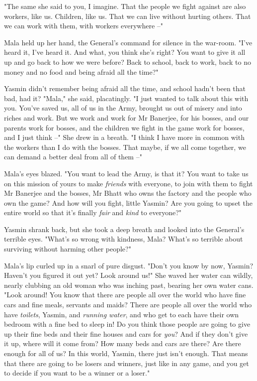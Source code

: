 "The same she said to you, I imagine. That the people we fight
against are also workers, like us. Children, like us. That we can
live without hurting others. That we can work with them, with
workers everywhere --"

Mala held up her hand, the General's command for silence in the
war-room. "I've heard it, I've heard it. And what, you think she's
right? You want to give it all up and go back to how we were
before? Back to school, back to work, back to no money and no food
and being afraid all the time?"

Yasmin didn't remember being afraid all the time, and school hadn't
been that bad, had it? "Mala," she said, placatingly. "I just
wanted to talk about this with you. You've saved us, all of us in
the Army, brought us out of misery and into riches and work. But we
work and work for Mr Banerjee, for his bosses, and our parents work
for bosses, and the children we fight in the game work for bosses,
and I just think --" She drew in a breath. "I think I have more in
common with the workers than I do with the bosses. That maybe, if
we all come together, we can demand a better deal from all of them
--"

Mala's eyes blazed. "You want to lead the Army, is that it? You
want to take us on this mission of yours to make \emph{friends}
with everyone, to join with them to fight Mr Banerjee and the
bosses, Mr Bhatt who owns the factory and the people who own the
game? And how will you fight, little Yasmin? Are you going to upset
the entire world so that it's finally \emph{fair} and \emph{kind}
to everyone?"

Yasmin shrank back, but she took a deep breath and looked into the
General's terrible eyes. "What's so wrong with kindness, Mala?
What's so terrible about surviving without harming other people?"

Mala's lip curled up in a snarl of pure disgust. "Don't you know by
now, Yasmin? Haven't you figured it out yet? Look around us!" She
waved her water can wildly, nearly clubbing an old woman who was
inching past, bearing her own water cans. "Look around! You know
that there are people all over the world who have fine cars and
fine meals, servants and maids? There are people all over the world
who have \emph{toilets}, Yasmin, and \emph{running water}, and who
get to each have their own bedroom with a fine bed to sleep in! Do
you think those people are going to give up their fine beds and
their fine houses and cars for \emph{you}? And if they don't give
it up, where will it come from? How many beds and cars are there?
Are there enough for all of us? In this world, Yasmin, there just
isn't enough. That means that there are going to be losers and
winners, just like in any game, and you get to decide if you want
to be a winner or a loser."

